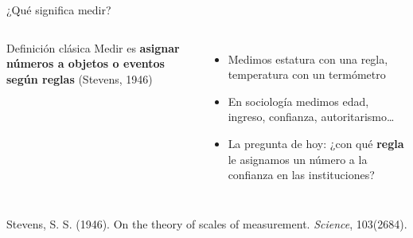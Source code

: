 \documentclass[aspectratio=169,11pt]{beamer}
\newcommand{\hl}[1]{\textcolor{marino}{\textbf{#1}}}        %
\newcommand{\fuente}[1]{\par\vfill{\scriptsize\color{gris}#1\par}}
\begin{document}
\begin{frame}{¿Qué significa medir?}
\begin{columns}[c]
\begin{block}{Definición clásica}
\small
Medir es \hl{asignar números a objetos o eventos según reglas} (Stevens, 1946)
\end{block}
\bigskip
\begin{itemize}
  \item Medimos estatura con una regla, temperatura con un termómetro
  \item En sociología medimos edad, ingreso, confianza, autoritarismo\ldots
  \item La pregunta de hoy: ¿con qué \textbf{regla} le asignamos un número a la confianza en las instituciones?
\end{itemize}
\centering
{}
\end{columns}
\fuente{Stevens, S. S. (1946). On the theory of scales of measurement. \emph{Science}, 103(2684).}
\end{frame}
\end{document}
